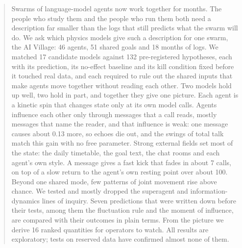 \begin{abstract}
Swarms of language-model agents now work together for months. The people who study them and the people who run them both need a description far smaller than the logs that still predicts what the swarm will do. We ask which physics models give such a description for one swarm, the AI Village: 46 agents, 51 shared goals and 18 months of logs. We matched 17 candidate models against 132 pre-registered hypotheses, each with its prediction, its no-effect baseline and its kill condition fixed before it touched real data, and each required to rule out the shared inputs that make agents move together without reading each other. Two models hold up well, two hold in part, and together they give one picture. Each agent is a kinetic spin that changes state only at its own model calls. Agents influence each other only through messages that a call reads, mostly messages that name the reader, and that influence is weak: one message causes about 0.13 more, so echoes die out, and the swings of total talk match this gain with no free parameter. Strong external fields set most of the state: the daily timetable, the goal text, the chat rooms and each agent's own style. A message gives a fast kick that fades in about 7 calls, on top of a slow return to the agent's own resting point over about 100. Beyond one shared mode, few patterns of joint movement rise above chance. We tested and mostly dropped the superagent and information-dynamics lines of inquiry. Seven predictions that were written down before their tests, among them the fluctuation rule and the moment of influence, are compared with their outcomes in plain terms. From the picture we derive 16 ranked quantities for operators to watch. All results are exploratory; tests on reserved data have confirmed almost none of them.
\end{abstract}
